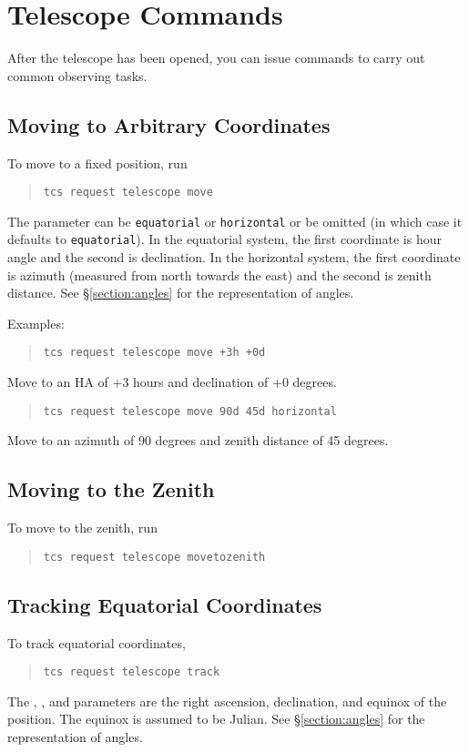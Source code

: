 \section{Telescope Commands}

After the telescope has been opened, you can issue commands to carry out common observing tasks.

\subsection{Moving to Arbitrary Coordinates}

To move to a fixed position, run
\begin{quote}
\verb|tcs request telescope move|    
\end{quote}
The  parameter can be \verb|equatorial| or \verb|horizontal| or be omitted (in which case it defaults to \verb|equatorial|). In the equatorial system, the first coordinate is hour angle and the second is declination. In the horizontal system, the first coordinate is azimuth (measured from north towards the east) and the second is zenith distance. See \S\ref{section:angles} for the representation of angles.

Examples:

\begin{quote}
\verb|tcs request telescope move +3h +0d|
\end{quote}
Move to an HA of +3 hours and declination of +0 degrees.

\begin{quote}
\verb|tcs request telescope move 90d 45d horizontal|
\end{quote}
Move to an azimuth of 90 degrees and zenith distance of 45 degrees.

\subsection{Moving to the Zenith}

To move to the zenith, run
\begin{quote}
\verb|tcs request telescope movetozenith|
\end{quote}

\subsection{Tracking Equatorial Coordinates}

To track equatorial coordinates,
\begin{quote}
\verb|tcs request telescope track|    
\end{quote}
The , , and  parameters are the right ascension, declination, and equinox of the position. The equinox is assumed to be Julian. See \S\ref{section:angles} for the representation of angles.

